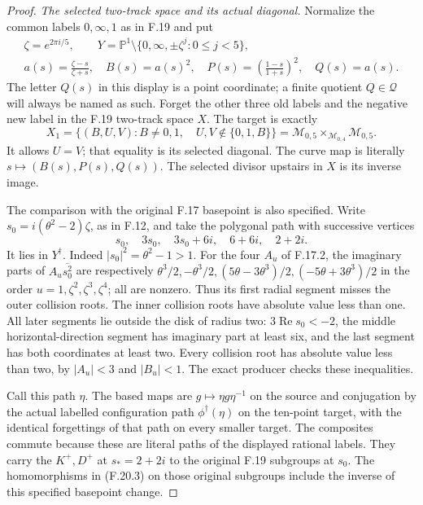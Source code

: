 \begin{proof}
\emph{The selected two-track space and its actual diagonal.}
Normalize the common labels $0,\infty,1$ as in F.19 and put
\[
 \begin{gathered}
 \zeta=e^{2\pi i/5},\qquad
 Y=\mathbb P^1\setminus\{0,\infty,\pm\zeta^j:0\leq j<5\},\\
 a(s)=\frac{\zeta-s}{\zeta+s},\quad
 B(s)=a(s)^2,\quad
 P(s)=\left(\frac{1-s}{1+s}\right)^2,\quad Q(s)=a(s).
 \end{gathered}                                                \tag{F.20.4}
\]
The letter $Q(s)$ in this display is a point coordinate;
a finite quotient $Q\in\mathscr Q$ will always be named as such.
Forget the other three old labels and the negative new label
in the F.19 two-track space $X$. The target is exactly
\[
 X_1=\{(B,U,V):B\ne0,1,\quad
                  U,V\notin\{0,1,B\}\}
       =\mathcal M_{0,5}\times_{\mathcal M_{0,4}}\mathcal M_{0,5}.
                                                               \tag{F.20.5}
\]
It allows $U=V$; that equality is its selected diagonal.
The curve map is literally $s\mapsto(B(s),P(s),Q(s))$.
The selected divisor upstairs in $X$ is its inverse image.

The comparison with the original F.17 basepoint is
also specified. Write
$s_0=i(\theta^2-2)\zeta$, as in F.12, and take the
polygonal path with successive vertices
\[
        s_0,\quad 3s_0,\quad 3s_0+6i,\quad
                         6+6i,\quad 2+2i.                    \tag{F.20.4a}
\]
It lies in $Y^\dagger$.
Indeed $|s_0|^2=\theta^2-1>1$.
For the four $A_u$ of F.17.2, the imaginary parts
of $A_u\overline{s_0^2}$ are respectively
$\theta^3/2,-\theta^3/2,
 (5\theta-3\theta^3)/2,
 (-5\theta+3\theta^3)/2$ in the order
$u=1,\zeta^2,\zeta^3,\zeta^4$; all are nonzero.
Thus its first radial segment misses the outer
collision roots. The inner collision roots have
absolute value less than one.
All later segments lie outside the disk of radius
two: $3\operatorname{Re}s_0<-2$, the middle
horizontal-direction segment has imaginary part
at least six, and the last segment has both
coordinates at least two.
Every collision root has absolute value less
than two, by $|A_u|<3$ and $|B_u|<1$.
The exact producer checks these inequalities.

Call this path $\eta$.
The based maps are $g\mapsto\eta g\eta^{-1}$
on the source and conjugation by the actual
labelled configuration path $\phi^\dagger(\eta)$
on the ten-point target, with the identical
forgettings of that path on every smaller target.
The composites commute because these are
literal paths of the displayed rational labels.
They carry the $K^+,D^+$ at $s_*=2+2i$ to the
original F.19 subgroups at $s_0$.
The homomorphisms in (F.20.3) on those original
subgroups include the inverse of this specified
basepoint change.


\end{proof}
